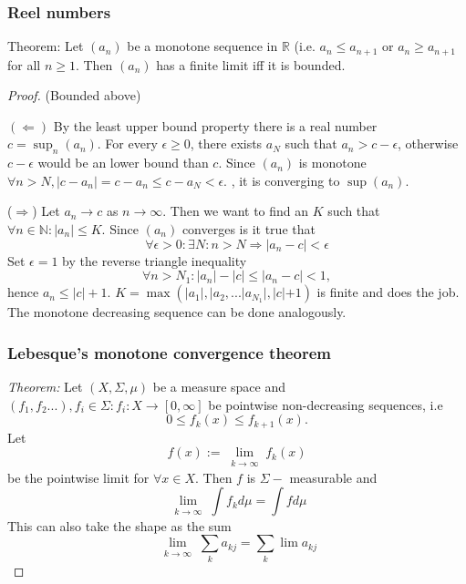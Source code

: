 \documentclass[titlepage]{article}
\begin{document}
\subsubsection{Reel numbers}
Theorem: Let $(a_n)$ be a monotone sequence in $\mathbb{R}$ (i.e. $a_n \leq a_{n+1}$ or $a_n \geq a_{n+1}$ for all $n\geq1$. Then $(a_n)$ has a finite limit iff it is bounded.
\begin{proof}
(Bounded above)

$(\Leftarrow)$
By the least upper bound property there is a real number $c = \sup_n (a_n)$. For every $\epsilon \geq 0$, there exists $a_N$ such that $a_n > c-\epsilon$, otherwise $c-\epsilon$ would be an lower bound than $c$. Since $(a_n)$ is monotone $\forall n>N, |c-a_n| = c-a_n \leq c-a_N < \epsilon.$ , it is converging to $\sup(a_n)$.

($\Rightarrow$) Let $a_n \rightarrow c$ as $n\rightarrow \infty$. Then we want to find an $K$ such that $\forall n \in \mathbb{N}: |a_n|\leq K$. Since $(a_n)$ converges is it true that $$\forall \epsilon >0: \exists N: n>N \Longrightarrow |a_n - c| < \epsilon$$
Set  $\epsilon = 1$ by the reverse triangle inequality
$$\forall n >N_1 : |a_n| - |c| \leq |a_n - c| < 1,$$
hence $a_n \leq |c| + 1$.
$K = \max \left(|a_1|, |a_2, ...|a_{N_1}|, |c|+1\right)$ is finite and does the job. The monotone decreasing sequence can be done analogously.
\subsubsection{Lebesque's monotone convergence theorem}
\textit{Theorem:} Let $(X,\Sigma, \mu)$ be a measure space and $(f_1,f_2...), f_i \in \Sigma : f_i: X \rightarrow [0,\infty]$ be pointwise non-decreasing sequences, i.e
$$ 0 \leq f_k(x) \leq f_{k+1}(x).$$
Let
$$f(x) := \lim\limits_{\substack{k\rightarrow \infty}} f_k(x)$$
be the pointwise limit for $\forall x \in X.$
Then $f$ is $\Sigma-$ measurable and 
\begin{equation}
\lim\limits_{\substack{k\rightarrow \infty}}\int f_k d\mu = \int f d\mu 
\end{equation}
This can also take the shape as the sum
\begin{equation}
\lim\limits_{\substack{k\rightarrow \infty}}\sum_k a_{kj} = \sum_k \lim a_{kj}
\end{equation}
\end{proof}
\end{document}
